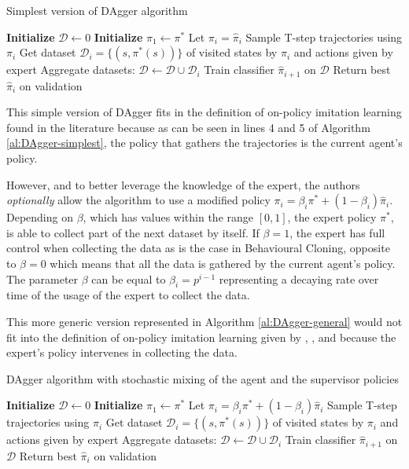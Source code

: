 \begin{algorithm}[H]
\caption{Simplest version of DAgger algorithm }
\begin{algorithmic}[1]
\State \textbf{Initialize} $\mathcal{D} \leftarrow 0$ 
\State \textbf{Initialize} $\hat{\pi}_1 \leftarrow \pi^*$ 
\State Let $\pi_i = \hat{\pi}_i$
\State Sample T-step trajectories using $\pi_i$
\State Get dataset  $\mathcal{D}_i = \{(s, \pi^*(s))\}$ of visited states by $\pi_i$ and actions given by expert
\State Aggregate datasets:  $\mathcal{D} \leftarrow \mathcal{D} \cup  \mathcal{D}_i$
\State  Train classifier $\hat{\pi}_{i+1}$ on $\mathcal{D}$
\EndFor
\State Return best $\hat{\pi}_i$ on validation
\end{algorithmic}
\label{al:DAgger-simplest}
\end{algorithm}

This simple version of DAgger fits in the definition of on-policy imitation learning found in the literature because as can be seen in lines 4 and 5 of Algorithm \ref{al:DAgger-simplest}, the policy that gathers the trajectories is the current agent's policy.


However, and to better leverage the knowledge of the expert, the authors \textit{optionally} allow the algorithm to use a modified policy $\pi_i=\beta_i\pi^*+ (1−\beta_i)\hat{\pi}_i$. Depending on $\beta$,  which has values within the range $[0,1]$, the expert policy $\pi^*$, is able to collect part of the next dataset by itself. If $\beta = 1$, the expert has full control when collecting the data as is the case in Behavioural Cloning, opposite to $\beta=0$  which means that all the data is gathered by the current agent's policy. The parameter $\beta$ can be equal to $\beta_i=p^{i−1}$ representing a decaying rate over time of the usage of the expert to collect the data.


This more generic version represented in Algorithm \ref{al:DAgger-general} would not fit into the definition of on-policy imitation learning given by \cite{Osa:2018}, \cite{DBLP:journals/corr/LaskeyLHLMFG17}, \cite{OtherLaskeydefinitions:2019} and \cite{Anotherdefinitionfromberkeley:2020} because the expert's policy  intervenes in collecting the data.



\begin{algorithm}[H]
\caption{DAgger algorithm with stochastic mixing of the agent and the supervisor policies }
\begin{algorithmic}[1]
\State \textbf{Initialize} $\mathcal{D} \leftarrow 0$ 
\State \textbf{Initialize} $\hat{\pi}_1 \leftarrow \pi^*$ 
\State Let $\pi_i = \beta_i\pi^* + (1 -\beta_i)\hat{\pi}_i$
\State Sample T-step trajectories using $\pi_i$
\State Get dataset  $\mathcal{D}_i = \{(s, \pi^*(s))\}$ of visited states by $\pi_i$ and actions given by expert
\State Aggregate datasets:  $\mathcal{D} \leftarrow \mathcal{D} \cup  \mathcal{D}_i$
\State  Train classifier $\hat{\pi}_{i+1}$ on $\mathcal{D}$
\EndFor
\State Return best $\hat{\pi}_i$ on validation
\end{algorithmic}
\label{al:DAgger-general}
\end{algorithm}

